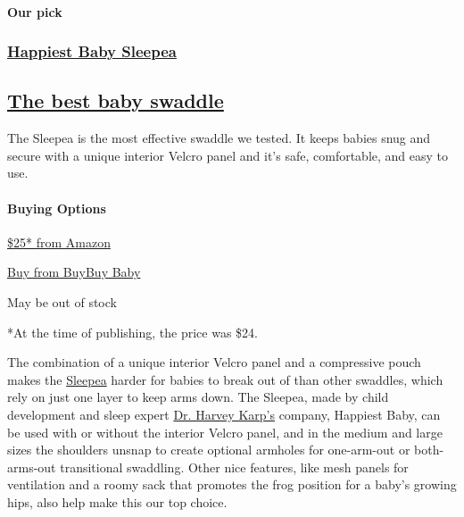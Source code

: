 \hypertarget{our-pick}{%
\paragraph{Our pick}\label{our-pick}}

\href{https://www.nytimes3xbfgragh.onion/wirecutter/out/link/30686/150977/4/86632?merchant=Amazon}{}

\hypertarget{happiest-baby-sleepea}{%
\subsubsection{\texorpdfstring{\href{https://www.nytimes3xbfgragh.onion/wirecutter/out/link/30686/150977/4/86632?merchant=Amazon}{Happiest
Baby Sleepea}}{Happiest Baby Sleepea}}\label{happiest-baby-sleepea}}

\hypertarget{the-best-baby-swaddle}{%
\subsection{\texorpdfstring{\href{https://www.nytimes3xbfgragh.onion/wirecutter/out/link/30686/150977/4/86632?merchant=Amazon}{The
best baby
swaddle}}{The best baby swaddle}}\label{the-best-baby-swaddle}}

The Sleepea is the most effective swaddle we tested. It keeps babies
snug and secure with a unique interior Velcro panel and it's safe,
comfortable, and easy to use.

\hypertarget{buying-options}{%
\paragraph{Buying Options}\label{buying-options}}

\href{https://www.nytimes3xbfgragh.onion/wirecutter/out/link/30686/150977/4/86632?merchant=Amazon}{\$25*
from Amazon}

\href{https://shop-links.co/1706409514726689177}{Buy from BuyBuy Baby}

May be out of stock

*At the time of publishing, the price was \$24.

The combination of a unique interior Velcro panel and a compressive
pouch makes the
\href{https://www.nytimes3xbfgragh.onion/wirecutter/out/link/30686/162165/4/86635/?merchant=BuyBuy\%20Baby}{Sleepea}
harder for babies to break out of than other swaddles, which rely on
just one layer to keep arms down. The Sleepea, made by child development
and sleep expert \href{https://www.happiestbaby.com/pages/dr-karp}{Dr.
Harvey Karp's} company, Happiest Baby, can be used with or without the
interior Velcro panel, and in the medium and large sizes the shoulders
unsnap to create optional armholes for one-arm-out or both-arms-out
transitional swaddling. Other nice features, like mesh panels for
ventilation and a roomy sack that promotes the frog position for a
baby's growing hips, also help make this our top choice.

